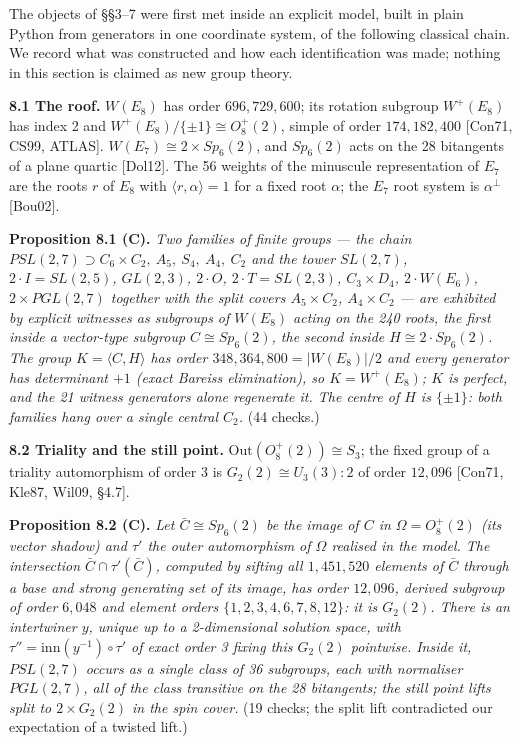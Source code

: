 \documentclass[
]{article}
\begin{document}
The objects of §§3--7 were first met inside an explicit model, built in
plain Python from generators in one coordinate system, of the following
classical chain. We record what was constructed and how each
identification was made; nothing in this section is claimed as new group
theory.

\textbf{8.1 The roof.} \(W(E_8)\) has order \(696{,}729{,}600\); its
rotation subgroup \(W^+(E_8)\) has index 2 and
\(W^+(E_8)/\{\pm 1\} \cong O_8^+(2)\), simple of order
\(174{,}182{,}400\) {[}Con71, CS99, ATLAS{]}.
\(W(E_7) \cong 2 \times Sp_6(2)\), and \(Sp_6(2)\) acts on the 28
bitangents of a plane quartic {[}Dol12{]}. The 56 weights of the
minuscule representation of \(E_7\) are the roots \(r\) of \(E_8\) with
\(\langle r, \alpha \rangle = 1\) for a fixed root \(\alpha\); the
\(E_7\) root system is \(\alpha^\perp\) {[}Bou02{]}.

\textbf{Proposition 8.1 (C).} \emph{Two families of finite groups ---
the chain \(PSL(2,7) \supset C_6 \times C_2,\ A_5,\ S_4,\ A_4,\ C_2\)
and the tower \(SL(2,7)\), \(2\cdot I = SL(2,5)\), \(GL(2,3)\),
\(2\cdot O\), \(2\cdot T = SL(2,3)\), \(C_3 \times D_4\),
\(2\cdot W(E_6)\), \(2 \times PGL(2,7)\) together with the split covers
\(A_5 \times C_2\), \(A_4 \times C_2\) --- are exhibited by explicit
witnesses as subgroups of \(W(E_8)\) acting on the 240 roots, the first
inside a vector-type subgroup \(C \cong Sp_6(2)\), the second inside
\(H \cong 2\cdot Sp_6(2)\). The group \(K = \langle C, H \rangle\) has
order \(348{,}364{,}800 = |W(E_8)|/2\) and every generator has
determinant \(+1\) (exact Bareiss elimination), so \(K = W^+(E_8)\);
\(K\) is perfect, and the 21 witness generators alone regenerate it. The
centre of \(H\) is \(\{\pm 1\}\): both families hang over a single
central \(C_2\).} (44 checks.)

\textbf{8.2 Triality and the still point.}
\(\mathrm{Out}(O_8^+(2)) \cong S_3\); the fixed group of a triality
automorphism of order 3 is \(G_2(2) \cong U_3(3){:}2\) of order
\(12{,}096\) {[}Con71, Kle87, Wil09, §4.7{]}.

\textbf{Proposition 8.2 (C).} \emph{Let \(\bar C \cong Sp_6(2)\) be the
image of \(C\) in \(\Omega = O_8^+(2)\) (its vector shadow) and
\(\tau'\) the outer automorphism of \(\Omega\) realised in the model.
The intersection \(\bar C \cap \tau'(\bar C)\), computed by sifting all
\(1{,}451{,}520\) elements of \(\bar C\) through a base and strong
generating set of its image, has order \(12{,}096\), derived subgroup of
order \(6{,}048\) and element orders \(\{1,2,3,4,6,7,8,12\}\): it is
\(G_2(2)\). There is an intertwiner \(y\), unique up to a 2-dimensional
solution space, with \(\tau'' = \mathrm{inn}(y^{-1}) \circ \tau'\) of
exact order 3 fixing this \(G_2(2)\) pointwise. Inside it, \(PSL(2,7)\)
occurs as a single class of 36 subgroups, each with normaliser
\(PGL(2,7)\), all of the class transitive on the 28 bitangents; the
still point lifts split to \(2 \times G_2(2)\) in the spin cover.} (19
checks; the split lift contradicted our expectation of a twisted lift.)
\end{document}
